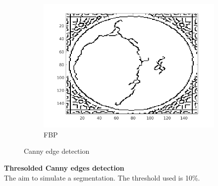 \documentclass[10pt,a4paper,titlepage]{article}
\begin{document}
\begin{figure}[H]
\begin{subfigure}[b]{0.32\textwidth}
            	\centering 
            	\includegraphics[width=\textwidth]{Sample1/Edges/FBP/p4_auto.png}
            	\caption{FBP}    
            	\label{subfig:FBP116p}
        	\end{subfigure}
       		
       		
       		
        	\caption{Canny edge detection}
        	\label{fig:Canny}
        	
    	\end{figure}

\clearpage
		\textbf{Thresolded Canny edges detection}\\
		The aim to simulate a segmentation. The threshold used is 10\%.
		
\end{document}

